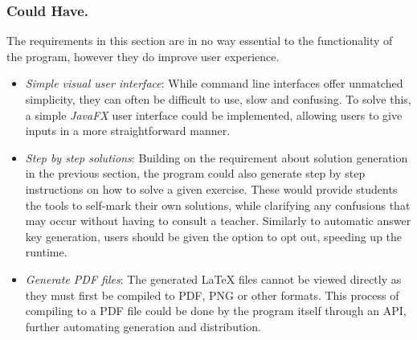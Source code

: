 \documentclass{l4proj}
\begin{document}
\subsubsection{Could Have.}
The requirements in this section are in no way essential to the functionality of the program, however they do improve user experience.
\begin{itemize}
	\item
	\emph{Simple visual user interface}: While command line interfaces offer unmatched simplicity, they can often be difficult to use, slow and confusing. To solve this, a simple \emph{JavaFX}   user interface could be implemented, allowing users to give inputs in a more straightforward manner.
	\item
	\emph{Step by step solutions}: Building on the requirement about solution generation in the previous section, the program could also generate step by step instructions on how to solve a given exercise. These would provide students the tools to self-mark their own solutions, while clarifying any confusions that may occur without having to consult a teacher. Similarly to automatic answer key generation, users should be given the option to opt out, speeding up the runtime.
	\item
	\emph{Generate PDF files}: The generated LaTeX files cannot be viewed directly as they must first be compiled to PDF, PNG or other formats. This process of compiling to a PDF file could be done by the program itself through an API, further automating generation and distribution.
\end{itemize}
\end{document}
